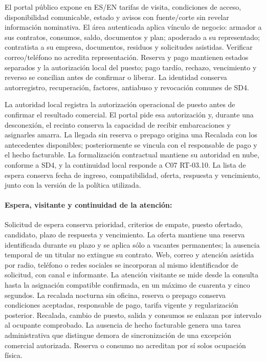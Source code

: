 El portal público expone en ES/EN tarifas de visita, condiciones de acceso, disponibilidad comunicable, estado y avisos con fuente/corte sin revelar información nominativa. El área autenticada aplica vínculo de negocio: armador a sus contratos, consumos, saldo, documentos y plan; apoderado a su representado; contratista a su empresa, documentos, residuos y solicitudes asistidas. Verificar correo/teléfono no acredita representación. Reserva y pago mantienen estados separados y la autorización local del puesto; pago tardío, rechazo, vencimiento y reverso se concilian antes de confirmar o liberar. La identidad conserva autorregistro, recuperación, factores, antiabuso y revocación comunes de SD4.

La autoridad local registra la autorización operacional de puesto antes de confirmar el resultado comercial. El portal pide esa autorización y, durante una desconexión, el recinto conserva la capacidad de recibir embarcaciones y asignarles amarra. La llegada sin reserva o prepago origina una Recalada con los antecedentes disponibles; posteriormente se vincula con el responsable de pago y el hecho facturable. La formalización contractual mantiene su autoridad en nube, conforme a SD4, y la continuidad local responde a C07 RT-03.10. La lista de espera conserva fecha de ingreso, compatibilidad, oferta, respuesta y vencimiento, junto con la versión de la política utilizada.

\paragraph{Espera, visitante y continuidad de la atención:}
Solicitud de espera conserva prioridad, criterios de empate, puesto ofertado, candidato, plazo de respuesta y vencimiento. La oferta mantiene una reserva identificada durante su plazo y se aplica sólo a vacantes permanentes; la ausencia temporal de un titular no extingue su contrato. Web, correo y atención asistida por radio, teléfono o redes sociales se incorporan al mismo identificador de solicitud, con canal e informante.
La atención visitante se mide desde la consulta hasta la asignación compatible confirmada, en un máximo de cuarenta y cinco segundos. La recalada nocturna sin oficina, reserva o prepago conserva condiciones aceptadas, responsable de pago, tarifa vigente y regularización posterior. Recalada, cambio de puesto, salida y consumos se enlazan por intervalo al ocupante comprobado. La ausencia de hecho facturable genera una tarea administrativa que distingue demora de sincronización de una excepción comercial autorizada. Reserva o consumo no acreditan por sí solos ocupación física.

